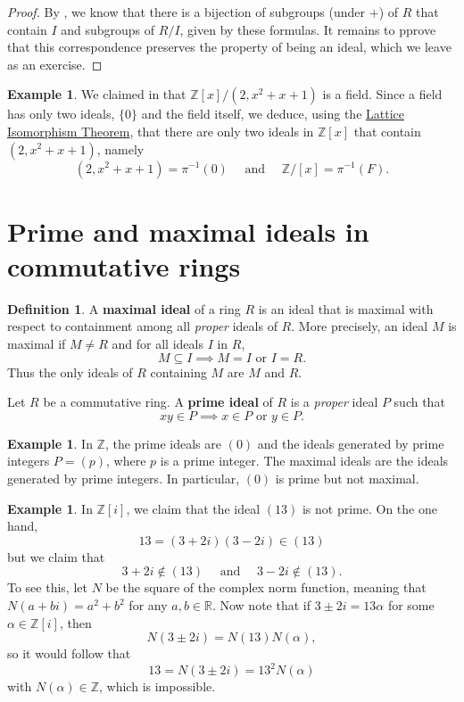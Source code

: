 \documentclass[12pt]{report}
\numberwithin{equation}{section}
\numberwithin{theorem}{chapter}
\theoremstyle{definition}
\newtheorem{definition}[theorem]{Definition}
\newtheorem{example}[theorem]{Example}
\newtheorem*{basic properties}{Basic Properties}
\newtheorem*{Important Remark}{Important Remark}
\newcommand{\df}[1]{{\bf #1}\index{#1}}
\begin{document}
\begin{proof} 
By , we know that there is a bijection of subgroups (under $+$) of $R$ that contain $I$ and subgroups of $R/I$, given by these formulas. It remains to pprove that this correspondence preserves the property of being an ideal, which we leave as an exercise.
\end{proof}



\begin{example} 
 We claimed in  that $\mathbb{Z}[x]/(2, x^2+x+1)$ is a field. Since a field has only two ideals, $\{0\}$ and the field itself, we deduce, using the \hyperref[lattice iso rings]{Lattice Isomorphism Theorem}, that there are only two ideals in $\mathbb{Z}[x]$ that contain $(2, x^2+ x+1)$, namely 
$$(2, x^2+ x+1)=\pi^{-1}(0) \quad \text{ and } \quad \mathbb{Z}/[x]=\pi^{-1}(F).$$
\end{example}



\section{Prime and maximal ideals in commutative rings}

\begin{definition}
A \df{maximal ideal} of a ring $R$ is an ideal that is maximal with respect to containment among all {\em proper} ideals of $R$. More precisely, an ideal $M$ is maximal if $M \neq R$ and for all ideals $I$ in $R$,
$$M \subseteq I \implies M = I \text{ or } I = R.$$
Thus the only ideals of $R$ containing $M$ are $M$ and $R$.
 
Let $R$ be a commutative ring.
A \df{prime ideal} of $R$ is a {\em proper} ideal $P$ such that
$$xy \in P \implies x \in P \text{ or } y \in P.$$ 
\end{definition}


\begin{example}
In $\mathbb{Z}$, the prime ideals are $(0)$ and the ideals generated by prime integers $P=(p)$, where $p$ is a prime integer. The maximal ideals are the ideals generated by prime integers. In particular, $(0)$ is prime but not maximal.
\end{example}


\begin{example}
In $\mathbb{Z}[i]$, we claim that the ideal $(13)$ is not prime. On the one hand, 
$$13=(3+2i)(3-2i)\in(13)$$
but we claim that
$$3+2i \notin (13) \quad \text{ and } \quad 3-2i \notin (13).$$ 
To see this, let $N$ be the square of the complex norm function, meaning that $N(a+bi) = a^2 + b^2$ for any $a, b \in \mathbb{R}$.
Now note that if $3\pm 2i = 13 \alpha$ for some $\alpha \in \mathbb{Z}[i]$, then
$$N(3\pm 2i)=N(13)N(\alpha),$$ 
so it would follow that 
$$13= N(3\pm 2i) = 13^2 N(\alpha)$$ 
with $N(\alpha) \in \mathbb{Z}$, which is impossible.
\end{example}
\end{document}
